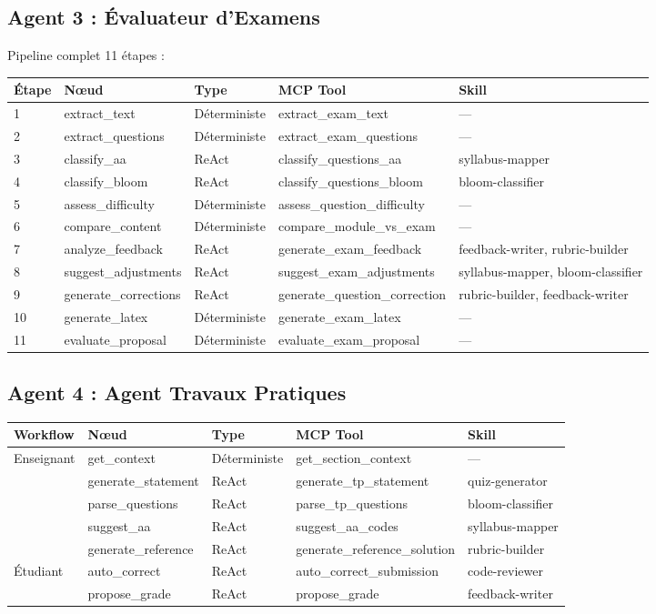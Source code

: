 \documentclass[12pt,a4paper]{article}
\begin{document}
\subsection{Agent 3 : Évaluateur d'Examens}

Pipeline complet 11 étapes :

\begin{longtable}{lllll}
\toprule
\textbf{Étape} & \textbf{Nœud} & \textbf{Type} & \textbf{MCP Tool} & \textbf{Skill} \\
\midrule
1 & extract\_text & Déterministe & extract\_exam\_text & --- \\
2 & extract\_questions & Déterministe & extract\_exam\_questions & --- \\
3 & classify\_aa & ReAct & classify\_questions\_aa & syllabus-mapper \\
4 & classify\_bloom & ReAct & classify\_questions\_bloom & bloom-classifier \\
5 & assess\_difficulty & Déterministe & assess\_question\_difficulty & --- \\
6 & compare\_content & Déterministe & compare\_module\_vs\_exam & --- \\
7 & analyze\_feedback & ReAct & generate\_exam\_feedback & feedback-writer, rubric-builder \\
8 & suggest\_adjustments & ReAct & suggest\_exam\_adjustments & syllabus-mapper, bloom-classifier \\
9 & generate\_corrections & ReAct & generate\_question\_correction & rubric-builder, feedback-writer \\
10 & generate\_latex & Déterministe & generate\_exam\_latex & --- \\
11 & evaluate\_proposal & Déterministe & evaluate\_exam\_proposal & --- \\
\bottomrule
\end{longtable}

\subsection{Agent 4 : Agent Travaux Pratiques}

\begin{longtable}{lllll}
\toprule
\textbf{Workflow} & \textbf{Nœud} & \textbf{Type} & \textbf{MCP Tool} & \textbf{Skill} \\
\midrule
\multirow{5}{*}{Enseignant} & get\_context & Déterministe & get\_section\_context & --- \\
& generate\_statement & ReAct & generate\_tp\_statement & quiz-generator \\
& parse\_questions & ReAct & parse\_tp\_questions & bloom-classifier \\
& suggest\_aa & ReAct & suggest\_aa\_codes & syllabus-mapper \\
& generate\_reference & ReAct & generate\_reference\_solution & rubric-builder \\
\midrule
\multirow{2}{*}{Étudiant} & auto\_correct & ReAct & auto\_correct\_submission & code-reviewer \\
& propose\_grade & ReAct & propose\_grade & feedback-writer \\
\bottomrule
\end{longtable}
\end{document}

